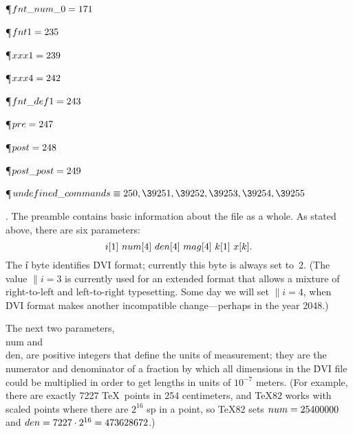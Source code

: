 \P\D {}$\\{fnt\_num\_0}=171$\par
\P\D {}$\\{fnt1}=235$\par
\P\D {}$\\{xxx1}=239$\par
\P\D {}$\\{xxx4}=242$\par
\P\D {}$\\{fnt\_def1}=243$\par
\P\D {}$\\{pre}=247$\par
\P\D {}$\\{post}=248$\par
\P\D {}$\\{post\_post}=249$\par
\P\D {}$\\{undefined\_commands}\S250,\39251,\39252,\39253,\39254,\39255$\par
\fi

. The preamble contains basic information about the file as a whole. As
stated above, there are six parameters:
$$\hbox{$\|i[1]$ $\\{num}[4]$ $\\{den}[4]$ $\\{mag}[4]$ $\|k[1]$ $\|x[\|k]$.}$$
The \|i byte identifies \.{DVI} format; currently this byte is always set
to~2. (The value $\|i=3$ is currently used for an extended format that
allows a mixture of right-to-left and left-to-right typesetting.
Some day we will set $\|i=4$, when \.{DVI} format makes another
incompatible change---perhaps in the year 2048.)

The next two parameters, \\{num} and \\{den}, are positive integers that define
the units of measurement; they are the numerator and denominator of a
fraction by which all dimensions in the \.{DVI} file could be multiplied
in order to get lengths in units of $10^{-7}$ meters. (For example, there are
exactly 7227 \TeX\ points in 254 centimeters, and \TeX82 works with scaled
points where there are $2^{16}$ sp in a point, so \TeX82 sets $%
\\{num}=25400000$
and $\\{den}=7227\cdot2^{16}=473628672$.)

